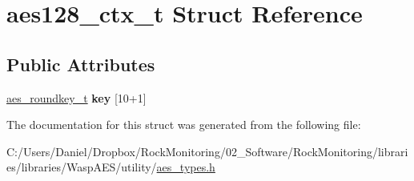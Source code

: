 \hypertarget{structaes128__ctx__t}{}\section{aes128\+\_\+ctx\+\_\+t Struct Reference}
\label{structaes128__ctx__t}
\subsection*{Public Attributes}
\begin{DoxyCompactItemize}
\item 
\hyperlink{structaes__roundkey__t}{aes\+\_\+roundkey\+\_\+t} {\bfseries key} \mbox{[}10+1\mbox{]}\hypertarget{structaes128__ctx__t_ab43de8e03e3871f16e5bc96689d0beaf}{}\label{structaes128__ctx__t_ab43de8e03e3871f16e5bc96689d0beaf}

\end{DoxyCompactItemize}


The documentation for this struct was generated from the following file\+:\begin{DoxyCompactItemize}
\item 
C\+:/\+Users/\+Daniel/\+Dropbox/\+Rock\+Monitoring/02\+\_\+\+Software/\+Rock\+Monitoring/libraries/libraries/\+Wasp\+A\+E\+S/utility/\hyperlink{aes__types_8h}{aes\+\_\+types.\+h}\end{DoxyCompactItemize}
